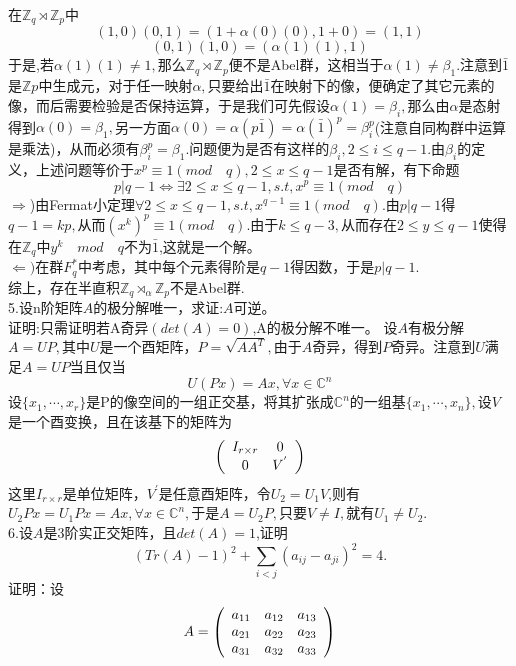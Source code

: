 \documentclass[UTF8]{article}
\begin{document}
	在$\mathbb{Z}_{q}\rtimes\mathbb{Z}_{p}$中$$
	(1,0)(0,1)=(1+\alpha(0)(0),1+0)=(1,1)$$$$
	(0,1)(1,0)=(\alpha(1)(1),1)
	$$
	于是,若$\alpha(1)(1)\neq 1,$那么$\mathbb{Z}_{q}\rtimes\mathbb{Z}_{p}$便不是Abel群，这相当于$\alpha(1)\neq \beta_{1}.$注意到$\bar{1}$是$\mathbb{Z}{p}$中生成元，对于任一映射$\alpha,$只要给出$\bar{1}$在映射下的像，便确定了其它元素的像，而后需要检验是否保持运算，于是我们可先假设$\alpha(1)=\beta_{i},$那么由$\alpha$是态射得到$\alpha(0)=\beta_{1},$另一方面$\alpha(0)=\alpha(p\bar{1})=\alpha(\bar{1})^{p}=\beta_{i}^{p}$(注意自同构群中运算是乘法)，从而必须有$\beta_{i}^{p}=\beta_{1}.$问题便为是否有这样的$\beta_{i},2\leq i\leq q-1$.由$\beta_{i}$的定义，上述问题等价于$x^{p}\equiv 1(mod \quad q),2\leq x\leq q-1$是否有解，有下命题\\
	$$p|q-1\iff \exists 2\leq x\leq q-1,s.t,x^{p}\equiv 1(mod \quad q)$$
	$\Rightarrow$)由Fermat小定理$\forall  2\leq x\leq q-1,s.t,x^{q-1}\equiv 1(mod \quad q).$由$p|q-1$得$q-1=kp,$从而$(x^{k})^{p}\equiv 1(mod\quad q).$由于$k\leq q-3,$从而存在$2\leq y\leq q-1$使得在$\mathbb{Z}_{q}$中$y^{k}\quad mod \quad q$不为$\bar{1}$,这就是一个解。\\
	$\Leftarrow)$在群$F_{q}^{*}$中考虑，其中每个元素得阶是$q-1$得因数，于是$p|q-1.$\\
	综上，存在半直积$\mathbb{Z}_{q}\rtimes_{\alpha}\mathbb{Z}_{p}$不是Abel群.\\
	5.设n阶矩阵$A$的极分解唯一，求证:$A$可逆。\\
	证明:只需证明若A奇异$(det(A)=0)$,A的极分解不唯一。
	设$A$有极分解$A=UP,$其中$U$是一个酉矩阵，$P=\sqrt{AA^{T}},$由于$A$奇异，得到$P$奇异。注意到$U$满足$A=UP$当且仅当$$
	U(Px)=Ax,\forall x\in \mathbb{C}^{n}
	$$
	设$\{x_{1},\cdots,x_{r}\}$是P的像空间的一组正交基，将其扩张成$\mathbb{C}^{n}$的一组基$\{x_{1},\cdots,x_{n}\},$设$V$是一个酉变换，且在该基下的矩阵为
	\begin{displaymath}
	\left(\begin{array}{c c}
	I_{r\times r} & 0 \\
	0 & V^{'}
	\end{array}\right)
	\end{displaymath}
	这里$I_{r\times r}$是单位矩阵，$V^{'}$是任意酉矩阵，令$U_{2}=U_{1}V$,则有$U_{2}Px=U_{1}Px=Ax,\forall x\in\mathbb{C}^{n},$于是$A=U_{2}P,$只要$V\neq I,$就有$U_{1}\neq U_{2}.$\\
	6.设$A$是3阶实正交矩阵，且$det(A)=1$,证明$$
	(Tr(A)-1)^{2}+\sum_{i<j}(a_{ij}-a_{ji})^{2}=4.
	$$
	证明：设
		\begin{displaymath}
	A=\left(\begin{array}{c cc}
	a_{11} & a_{12}&a_{13} \\
	a_{21}& a_{22}&a_{23}\\
	a_{31}&a_{32}&a_{33}
	\end{array}\right)
	\end{displaymath}
\end{document}
